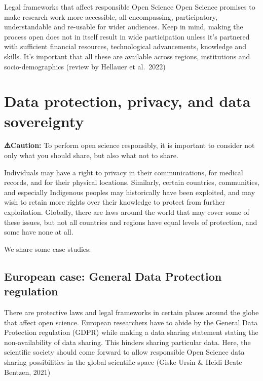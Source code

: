 \documentclass[
  letterpaper,
  DIV=11,
  numbers=noendperiod]{scrreport}
\begin{document}
Legal frameworks that affect responsible Open Science Open Science
promises to make research work more accessible, all-encompassing,
participatory, understandable and re-usable for wider audiences. Keep in
mind, making the process open does not in itself result in wide
participation unless it's partnered with sufficient financial resources,
technological advancements, knowledge and skills. It's important that
all these are available across regions, institutions and
socio-demographics (review by Hellauer et al.~2022)

\hypertarget{data-protection-privacy-and-data-sovereignty}{%
\section{Data protection, privacy, and data
sovereignty}\label{data-protection-privacy-and-data-sovereignty}}

\textbf{⚠️Caution:} To perform open science responsibly, it is important
to consider not only what you should share, but also what not to share.

Individuals may have a right to privacy in their communications, for
medical records, and for their physical locations. Similarly, certain
countries, communities, and especially Indigenous peoples may
historically have been exploited, and may wish to retain more rights
over their knowledge to protect from further exploitation. Globally,
there are laws around the world that may cover some of these issues, but
not all countries and regions have equal levels of protection, and some
have none at all.

We share some case studies:

\hypertarget{european-case-general-data-protection-regulation}{%
\subsection{European case: General Data Protection
regulation}\label{european-case-general-data-protection-regulation}}

There are protective laws and legal frameworks in certain places around
the globe that affect open science. European researchers have to abide
by the General Data Protection regulation (GDPR) while making a data
sharing statement stating the non-availability of data sharing. This
hinders sharing particular data. Here, the scientific society should
come forward to allow responsible Open Science data sharing
possibilities in the global scientific space (Giske Ursin \& Heidi Beate
Bentzen, 2021)
\end{document}
